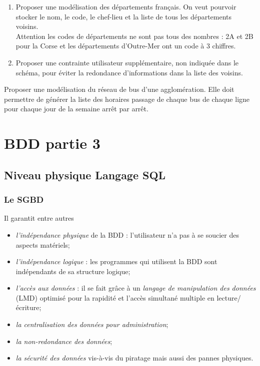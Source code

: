 \documentclass[10pt,cours,a4paper,firamath]{nsi}
\begin{document}
\begin{exercice}[]
	\begin{enumerate}
		\item 	Proposer une modélisation des départements français. On veut pourvoir stocker le nom, le code, le chef-lieu et la liste de tous les départements voisins.\\
		      Attention les codes de départements ne sont pas tous des nombres : 2A et 2B pour la Corse et les départements d'Outre-Mer ont un code à 3 chiffres.\\
		\item 	Proposer une contrainte utilisateur supplémentaire, non indiquée dans le schéma, pour éviter la redondance d'informations dans la liste des voisins.
	\end{enumerate}
\end{exercice}

\begin{exercice}[]
	Proposer une modélisation du réseau de bus d'une agglomération. Elle doit permettre de générer la liste des horaires passage de chaque bus de chaque ligne pour chaque jour de la semaine arrêt par arrêt.
\end{exercice}

\chapter{BDD partie 3}
\section{Niveau physique Langage SQL}
\subsection{Le SGBD}
Il garantit entre autres
\begin{itemize}
    \item	\textit{l'indépendance physique} de la BDD : l'utilisateur n'a pas à se soucier des aspects matériels;
    \item	\textit{l'indépendance logique} : les programmes qui utilisent la BDD sont indépendants de sa structure logique;
    \item 	\textit{l'accès aux données} : il se fait grâce à un \textit{langage de manipulation des données} (LMD) optimisé pour la rapidité et l'accès simultané multiple en lecture/écriture;
    \item 	\textit{la centralisation des données pour administration};
    \item 	\textit{la non-redondance des données};
    \item 	\textit{la sécurité des données} vis-à-vis du piratage mais aussi des pannes physiques.
\end{itemize}
\end{document}
